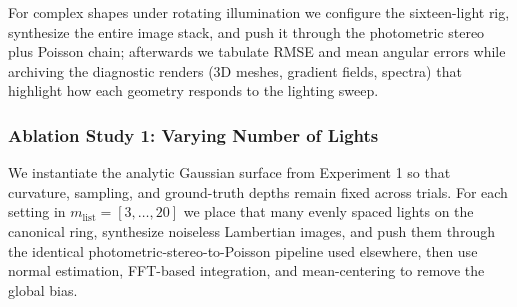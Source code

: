 \documentclass[11pt]{article}
\begin{document}
For complex shapes under rotating illumination we configure the sixteen-light rig, synthesize the entire image stack, and push it through the photometric stereo plus
Poisson chain; afterwards we tabulate RMSE and mean angular errors while archiving the diagnostic renders (3D meshes, gradient fields, spectra) that highlight how each
geometry responds to the lighting sweep.

\subsubsection{Ablation Study 1: Varying Number of Lights}

We instantiate the analytic Gaussian surface from Experiment 1 so that curvature,
sampling, and ground-truth depths remain fixed across trials. For each setting in
$m_{\text{list}} = [3,\dots,20]$ we place that many evenly spaced lights on the
canonical ring, synthesize noiseless Lambertian images, and push them through the
identical photometric-stereo-to-Poisson pipeline used elsewhere, then use normal estimation,
FFT-based integration, and mean-centering to remove the global bias. 

  \begin{center}
  \end{center}
\end{document}
